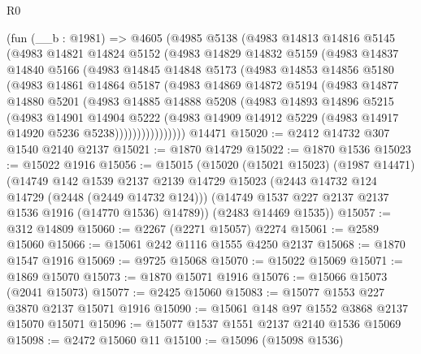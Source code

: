 \begin{lexlean}{R0}
\begin{coremodule}
    (fun (__b : @1981) =>
    @4605
      (@4985
        @5138
        (@4983
          @14813
          @14816
          @5145
          (@4983
            @14821
            @14824
            @5152
            (@4983
              @14829
              @14832
              @5159
              (@4983
                @14837
                @14840
                @5166
                (@4983
                  @14845
                  @14848
                  @5173
                  (@4983
                    @14853
                    @14856
                    @5180
                    (@4983
                      @14861
                      @14864
                      @5187
                      (@4983
                        @14869
                        @14872
                        @5194
                        (@4983
                          @14877
                          @14880
                          @5201
                          (@4983
                            @14885
                            @14888
                            @5208
                            (@4983
                              @14893
                              @14896
                              @5215
                              (@4983
                                @14901
                                @14904
                                @5222
                                (@4983
                                  @14909
                                  @14912
                                  @5229
                                  (@4983 @14917 @14920 @5236 @5238))))))))))))))))
    @14471
@15020 := @2412 @14732 @307 @1540 @2140 @2137
@15021 := @1870 @14729
@15022 := @1870 @1536
@15023 := @15022 @1916
@15056 := @15015
    (@15020
      (@15021 @15023)
      (@1987 @14471)
      (@14749
        @142
        @1539
        @2137
        @2139
        @14729
        @15023
        (@2443 @14732 @124 @14729 (@2448 (@2449 @14732 @124)))
        (@14749 @1537 @227 @2137 @2137 @1536 @1916 (@14770 @1536) @14789))
      (@2483 @14469 @1535))
@15057 := @312 @14809
@15060 := @2267 (@2271 @15057) @2274
@15061 := @2589 @15060
@15066 := @15061 @242 @1116 @1555 @4250 @2137
@15068 := @1870 @1547 @1916
@15069 := @9725 @15068
@15070 := @15022 @15069
@15071 := @1869 @15070
@15073 := @1870 @15071 @1916
@15076 := @15066 @15073 (@2041 @15073)
@15077 := @2425 @15060
@15083 := @15077 @1553 @227 @3870 @2137 @15071 @1916
@15090 := @15061 @148 @97 @1552 @3868 @2137 @15070 @15071
@15096 := @15077 @1537 @1551 @2137 @2140 @1536 @15069
@15098 := @2472 @15060 @11
@15100 := @15096 (@15098 @1536)

\end{coremodule}
\end{lexlean}
